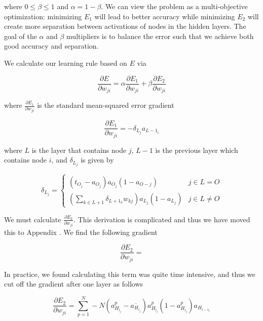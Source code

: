 where $0 \leq \beta \leq 1$ and $\alpha = 1 - \beta$.
We can view the problem as a multi-objective optimization:
minimizing $E_1$ will lead to better accuracy while
minimizing $E_2$ will create more separation between activations of
nodes in the hidden layers. The goal of the $\alpha$ and $\beta$
multipliers is to balance the error such that we achieve
both good accuracy and separation.

We calculate our learning rule based on $E$ via

\begin{equation}
  \frac{\partial E}{\partial w_{ji}} = \alpha \frac{\partial E_1}{\partial w_{ji}} + \beta \frac{\partial E_2}{\partial w_{ji}}
\end{equation}

where $\frac{\partial E_1}{\partial w_{ji}}$ is the standard mean-squared error gradient

\begin{equation}
  \frac{\partial E_1}{\partial w_{ji}} = -\delta_{L_j}a_{L-1_i} 
\end{equation}

where $L$ is the layer that contains node $j$, $L-1$ is the previous layer
which contains node $i$, and $\delta_{L_j}$ is given by

\begin{equation}
  \delta_{L_j} =
  \begin{cases}
    (t_{O_j} - a_{O_j})a_{O_j}(1-a_{O-j}) & j \in L = O \\
    (\sum_{k \in L+1}{\delta_{L+1_k}w_{kj}})a_{L_j}(1-a_{L_j}) & j \in L \neq O
  \end{cases}
\end{equation}

We must calculate $\frac{\partial E_2}{\partial w_{ji}}$. This derivation is
complicated and thus we have moved this to Appendix
.
We find the following gradient

\begin{equation}
  \frac{\partial E_2}{\partial w_{ji}} = 
\end{equation}

In practice, we found calculating this term was quite time intensive, and thus
we cut off the gradient after one layer as follows

\begin{equation}
  \frac{\partial E_2}{\partial w_{ji}} = \sum_{p=1}^{N} -N(a_{H_{l_j}}^p - \overline{a_{H_{l_j}}})a_{H_{l_j}}^p(1-a_{H_{l_j}}^p)a_{H_{l-1_i}}
\end{equation}

